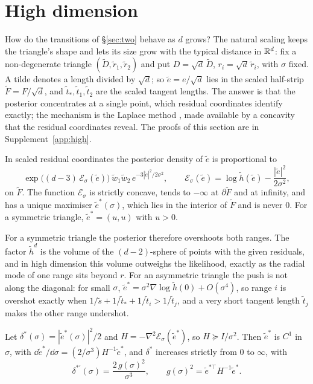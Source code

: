 \section{High dimension}\label{sec:high}

How do the transitions of \S\ref{sec:two} behave as $d$ grows? The natural scaling keeps the triangle's shape and
lets its size grow with the typical distance in $\mathbb{R}^d$: fix a non-degenerate triangle $(\tilde D, \tilde r_1, \tilde r_2)$
and put $D = \sqrt d\,\tilde D$, $r_i = \sqrt d\,\tilde r_i$, with $\sigma$ fixed. A tilde denotes a length divided by
$\sqrt d$; so $\tilde e = e/\sqrt d$ lies in the scaled half-strip $\tilde F = F/\sqrt d$, and $\tilde t_*, \tilde t_1, \tilde t_2$
are the scaled tangent lengths. The answer is that the posterior concentrates at a single point, which residual
coordinates identify exactly; the mechanism is the Laplace method \citep{wong1989}, made available by a concavity that
the residual coordinates reveal. The proofs of this section are in Supplement~\ref{app:high}.

\begin{lemma}\label{lem:conc}
In scaled residual coordinates the posterior density of $\tilde e$ is proportional to
\[ \exp\bigl((d - 3)\,\mathcal E_\sigma(\tilde e)\bigr)\,\tilde w_1\tilde w_2\,e^{-3|\tilde e|^2/2\sigma^2}, \qquad
   \mathcal E_\sigma(\tilde e) = \log\tilde h(\tilde e) - \frac{|\tilde e|^2}{2\sigma^2}, \]
on $\tilde F$. The function $\mathcal E_\sigma$ is strictly concave, tends to $-\infty$ at $\partial\tilde F$ and at infinity, and
has a unique maximiser $\tilde e^*(\sigma)$, which lies in the interior of $\tilde F$ and is never $0$. For a symmetric
triangle, $\tilde e^* = (u, u)$ with $u > 0$.
\end{lemma}

For a symmetric triangle the posterior therefore overshoots both ranges. The factor $\tilde h^{d}$ is the volume of the
$(d-2)$-sphere of points with the given residuals, and in high dimension this volume outweighs the likelihood, exactly as
the radial mode of one range sits beyond $r$. For an asymmetric triangle the push is not along the diagonal: for small
$\sigma$, $\tilde e^* = \sigma^2\nabla\log\tilde h(0) + O(\sigma^4)$, so range $i$ is overshot exactly when
$1/\tilde s + 1/\tilde t_* + 1/\tilde t_i > 1/\tilde t_j$, and a very short tangent length $\tilde t_j$ makes the other range
undershot.

\begin{lemma}\label{lem:cdepth}
Let $\delta^*(\sigma) = |\tilde e^*(\sigma)|^2/2$ and $H = -\nabla^2\mathcal E_\sigma(\tilde e^*)$, so $H \succeq I/\sigma^2$. Then
$\tilde e^*$ is $C^1$ in $\sigma$, with $\dd\tilde e^*/\dd\sigma = (2/\sigma^3)H^{-1}\tilde e^*$, and $\delta^*$ increases strictly
from $0$ to $\infty$, with
\[ \delta^{*\prime}(\sigma) = \frac{2\,g(\sigma)^2}{\sigma^3}, \qquad g(\sigma)^2 = \tilde e^{*\top}H^{-1}\tilde e^* . \]
\end{lemma}

